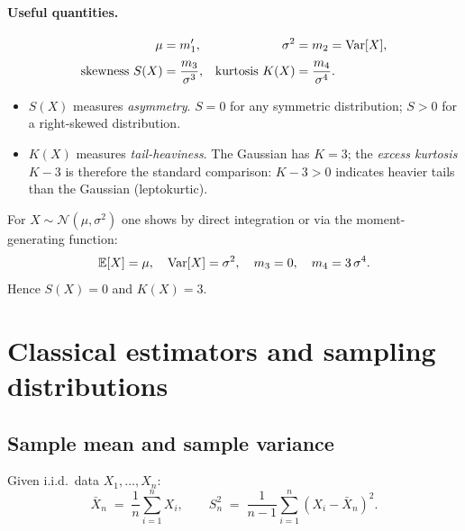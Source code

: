 \paragraph{Useful quantities.}
\begin{align*}
  \mu          &= m'_1, &
  \sigma^2     &= m_2 = \mathrm{Var}[X], \\[2pt]
  \text{skewness } S(X) &= \frac{m_3}{\sigma^3}, &
  \text{kurtosis } K(X) &= \frac{m_4}{\sigma^4}.
\end{align*}

\begin{rembox}[Interpretation]
\begin{itemize}
  \item $S(X)$ measures \emph{asymmetry}. $S = 0$ for any symmetric
        distribution; $S > 0$ for a right-skewed distribution.
  \item $K(X)$ measures \emph{tail-heaviness}. The Gaussian has $K = 3$;
        the \emph{excess kurtosis} $K - 3$ is therefore the standard
        comparison: $K - 3 > 0$ indicates heavier tails than the
        Gaussian (leptokurtic).
\end{itemize}
\end{rembox}

\begin{exbox}
For $X \sim \mathcal{N}(\mu, \sigma^2)$ one shows by direct integration
or via the moment-generating function:
\[
  \mathbb{E}[X] = \mu, \quad \mathrm{Var}[X] = \sigma^2, \quad m_3 = 0, \quad m_4 = 3\,\sigma^4.
\]
Hence $S(X) = 0$ and $K(X) = 3$.
\end{exbox}

\section{Classical estimators and sampling distributions}
\label{sec:estimators}

\subsection{Sample mean and sample variance}

\begin{defbox}
Given i.i.d.\ data $X_1, \dots, X_n$:
\[
  \bar{X}_n \;=\; \frac{1}{n}\sum_{i=1}^{n} X_i,
  \qquad
  S_n^2 \;=\; \frac{1}{n-1}\sum_{i=1}^{n}(X_i - \bar{X}_n)^2.
\]
\end{defbox}

